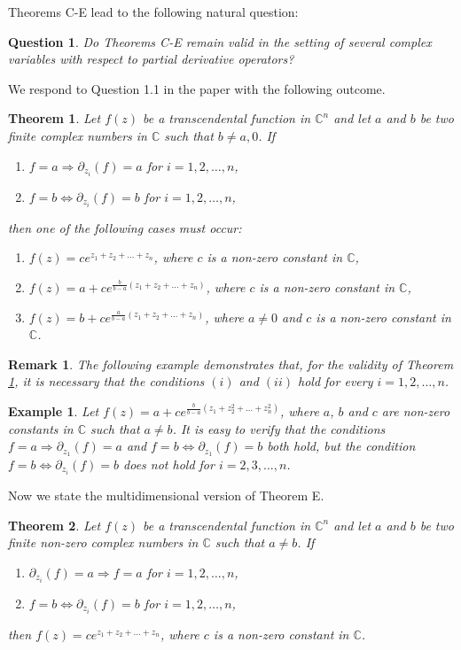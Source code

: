 \documentclass[11pt, reqno]{amsart}
\newtheorem*{cor A}{Corollary A}
\newtheorem*{cor B}{Corollary B}
\newtheorem{ques}{Question}[section]
\newtheorem{theo}{Theorem}[section]
\newtheorem{exm}{Example}[section]
\newtheorem{rem}{Remark}[section]
\numberwithin{equation}{section}
\begin{document}
\medskip
Theorems C-E lead to the following natural question:
\begin{ques} Do Theorems C-E remain valid in the setting of several complex variables with respect to partial derivative operators?
\end{ques}

We respond to Question 1.1 in the paper with the following outcome.

\begin{theo}\label{t1.1} Let $f(z)$ be a transcendental function in $\mathbb{C}^n$ and let $a$ and $b$ be two finite complex numbers  in $\mathbb{C}$ such that $b\not=a, 0$. If 
\begin{enumerate}
\item[(i)] $f=a\Rightarrow \partial_{z_i}(f)=a$ for $i=1,2,\ldots,n$,
\item[(ii)] $f=b\Leftrightarrow \partial_{z_i}(f)=b$ for $i=1,2,\ldots,n$, 
\end{enumerate}
then one of the following cases must occur:
\begin{enumerate} 
\item[(1)] $f(z)=ce^{z_1+z_2+\ldots+z_n}$, where $c$ is a non-zero constant in $\mathbb{C}$, 
\item[(2)] $f(z)=a+ce^{\frac{b}{b-a}(z_1+z_2+\ldots+z_n)}$, where $c$ is a non-zero constant in $\mathbb{C}$,
\item[(3)] $f(z)=b+ce^{\frac{a}{b-a}(z_1+z_2+\ldots+z_n)}$, where $a\neq 0$ and $c$ is a non-zero constant in $\mathbb{C}$.
\end{enumerate}
\end{theo}

\begin{rem} The following example demonstrates that, for the validity of Theorem \ref{t1.1}, it is necessary that the conditions $(i)$ and $(ii)$ hold for every $i=1,2,\ldots,n$.
\end{rem}
\begin{exm} Let $f(z)=a+ce^{\frac{b}{b-a}(z_1+z_2^2+\ldots+z_n^2)}$, where $a$, $b$ and $c$ are non-zero constants in $\mathbb{C}$ such that $a\neq b$. It is easy to verify that the conditions $f=a\Rightarrow \partial_{z_1}(f)=a$ and $f=b\Leftrightarrow \partial_{z_1}(f)=b$ both hold, but the condition $f=b\Leftrightarrow \partial_{z_i}(f)=b$ does not hold for $i=2,3,\ldots,n$.
\end{exm}

Now we state the multidimensional version of Theorem E.

\begin{theo}\label{t1.2} Let $f(z)$ be a transcendental function in $\mathbb{C}^n$ and let $a$ and $b$ be two finite non-zero complex numbers in $\mathbb{C}$ such that $a\not=b$. If 
\begin{enumerate}
\item[(i)] $\partial_{z_i}(f)=a\Rightarrow f=a$ for $i=1,2,\ldots,n$,
\item[(ii)] $f=b\Leftrightarrow \partial_{z_i}(f)=b$ for $i=1,2,\ldots,n$, 
\end{enumerate}
then $f(z)=ce^{z_1+z_2+\ldots+z_n}$, where $c$ is a non-zero constant in $\mathbb{C}$.
\end{theo}
\end{document}
